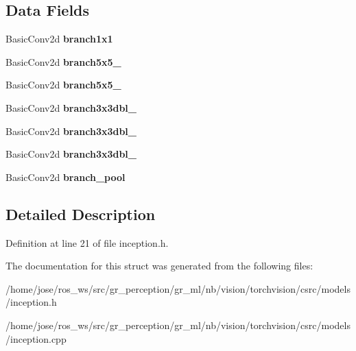 \subsection*{Data Fields}
\begin{DoxyCompactItemize}
\item 
\mbox{\label{structvision_1_1models_1_1__inceptionimpl_1_1InceptionAImpl_a4acc6f3ecefbacdb0da9ed1a28590279}} 
Basic\+Conv2d {\bfseries branch1x1}
\item 
\mbox{\label{structvision_1_1models_1_1__inceptionimpl_1_1InceptionAImpl_ac4e67ca6ca25cb5f3deb5ede582a1575}} 
Basic\+Conv2d {\bfseries branch5x5\+\_}
\item 
\mbox{\label{structvision_1_1models_1_1__inceptionimpl_1_1InceptionAImpl_a8d4c324d6f07bed7f370a8b4db61e1f4}} 
Basic\+Conv2d {\bfseries branch5x5\+\_}
\item 
\mbox{\label{structvision_1_1models_1_1__inceptionimpl_1_1InceptionAImpl_a8116211a948fbf95bbf065e9504c1260}} 
Basic\+Conv2d {\bfseries branch3x3dbl\+\_}
\item 
\mbox{\label{structvision_1_1models_1_1__inceptionimpl_1_1InceptionAImpl_a0fa1d961eedb80dda5fab50d5f80b7f7}} 
Basic\+Conv2d {\bfseries branch3x3dbl\+\_}
\item 
\mbox{\label{structvision_1_1models_1_1__inceptionimpl_1_1InceptionAImpl_aa87e33cbfdf4a0e09d35376240e3d669}} 
Basic\+Conv2d {\bfseries branch3x3dbl\+\_}
\item 
\mbox{\label{structvision_1_1models_1_1__inceptionimpl_1_1InceptionAImpl_a940a77df11202dd810e12acdd298db58}} 
Basic\+Conv2d {\bfseries branch\+\_\+pool}
\end{DoxyCompactItemize}


\subsection{Detailed Description}


Definition at line 21 of file inception.\+h.



The documentation for this struct was generated from the following files\+:\begin{DoxyCompactItemize}
\item 
/home/jose/ros\+\_\+ws/src/gr\+\_\+perception/gr\+\_\+ml/nb/vision/torchvision/csrc/models/inception.\+h\item 
/home/jose/ros\+\_\+ws/src/gr\+\_\+perception/gr\+\_\+ml/nb/vision/torchvision/csrc/models/inception.\+cpp\end{DoxyCompactItemize}
